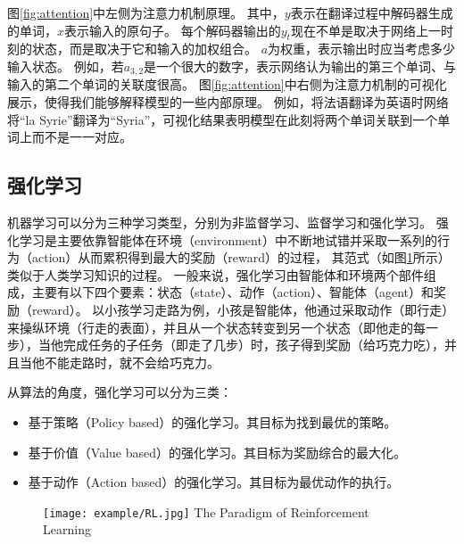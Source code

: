 图\ref{fig:attention}中左侧为注意力机制原理。
其中，$y$表示在翻译过程中解码器生成的单词，$x$表示输入的原句子。
每个解码器输出的$y_t$现在不单是取决于网络上一时刻的状态，而是取决于它和输入的加权组合。
$a$为权重，表示输出时应当考虑多少输入状态。
例如，若$a_{3,2}$是一个很大的数字，表示网络认为输出的第三个单词、与输入的第二个单词的关联度很高。
图\ref{fig:attention}中右侧为注意力机制的可视化展示，使得我们能够解释模型的一些内部原理。
例如，将法语翻译为英语时网络将“la Syrie”翻译为“Syria”，可视化结果表明模型在此刻将两个单词关联到一个单词上而不是一一对应。


\subsection{强化学习}

机器学习可以分为三种学习类型，分别为非监督学习、监督学习和强化学习。
强化学习是主要依靠智能体在环境（environment）中不断地试错并采取一系列的行为（action）从而累积得到最大的奖励（reward）的过程，
其范式（如图\ref{fig:RL}所示）类似于人类学习知识的过程。
一般来说，强化学习由智能体和环境两个部件组成，主要有以下四个要素：状态（state）、动作（action）、智能体（agent）和奖励（reward）。
以小孩学习走路为例，小孩是智能体，他通过采取动作（即行走）来操纵环境（行走的表面），并且从一个状态转变到另一个状态（即他走的每一步），当他完成任务的子任务（即走了几步）时，孩子得到奖励（给巧克力吃），并且当他不能走路时，就不会给巧克力。

从算法的角度，强化学习可以分为三类：
\begin{itemize}
  \item 基于策略（Policy based）的强化学习。其目标为找到最优的策略。
  \item 基于价值（Value based）的强化学习。其目标为奖励综合的最大化。
  \item 基于动作（Action based）的强化学习。其目标为最优动作的执行。
\end{itemize}
\begin{figure}[!htp]
  \centering
  \texttt{[image: example/RL.jpg]}
    {The Paradigm of Reinforcement Learning}
  \label{fig:RL}
\end{figure}



